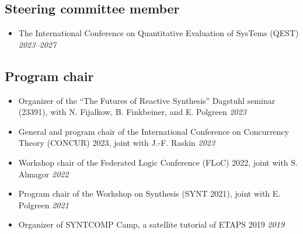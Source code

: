 \documentclass[10pt,a4paper]{moderncv}
\begin{document}
\subsection{Steering committee member}
\begin{itemize}
  \item The International Conference on Quantitative Evaluation of SysTems
    (QEST) \hfill \textit{2023--2027}
\end{itemize}

\subsection{Program chair}
\begin{itemize}
  \item Organizer of the ``The Futures of Reactive Synthesis'' Dagstuhl
    seminar (23391), with N. Fijalkow, B. Finkbeiner, and E. Polgreen \hfill
    \textit{2023}
  \item General and program chair of the International Conference on
    Concurrency Theory (CONCUR) 2023, joint with J.-F. Raskin \hfill
    \textit{2023}
  \item Workshop chair of the Federated Logic Conference (FLoC) 2022, joint
    with S. Almagor \hfill \textit{2022}
  \item Program chair of the Workshop on Synthesis (SYNT 2021), joint
    with E. Polgreen \hfill \textit{2021}
  \item Organizer of SYNTCOMP Camp, a satellite tutorial of ETAPS 2019
    \hfill \textit{2019}
\end{itemize}
\end{document}
